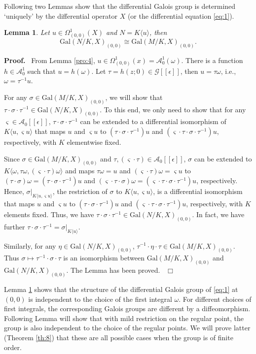 \documentclass[preprint, 12pt]{elsarticle}
\newtheorem{lem}[thm]{Lemma}
\numberwithin{equation}{section}
\newenvironment{proof}[1][Proof]{\textbf{#1.}\ }{\ $\Box$}
\newcommand{\A}{\mathcal{A}}
\newcommand{\G}{\mathcal{G}}
\newcommand{\Gal}{\mathrm{Gal}}
\newcommand{\CA}{\G[[\epsilon]]}
\begin{document}
Following two Lemmas show that the differential Galois group is
determined `uniquely' by the differential operator $X$ (or the
differential equation \eqref{eq:1}).

\begin{lem}
\label{le:1} Let $u\in \Omega_{(0,0)}^1(X)$ and $N = K\langle u
\rangle$, then $$\Gal(N/K, X)_{(0,0)}\cong \Gal(M/K,X)_{(0,0)}.$$
\end{lem}
\begin{proof}
From Lemma \ref{pro:4}, $u\in \Omega_{(0,0)}^1(x) =
\A_0^1(\omega)$. There is a function $h\in \A_0^1$ such that $u =
h(\omega)$. Let $\tau = h(z;0)\in \CA$, then $u = \tau\omega$,
i.e., $\omega = \tau^{-1}u$.

For any $\sigma\in \Gal(M/K,X)_{(0,0)}$, we will show that
$\tau\cdot\sigma\cdot\tau^{-1}\in \Gal(N/K,X)_{(0,0)}$. To this
end, we only need to show that for any $\varsigma\in
\A_0[[\epsilon]]$, $\tau\cdot\sigma\cdot\tau^{-1}$ can be extended
to a differential isomorphism of $K\langle u, \varsigma u \rangle$
that maps $u$ and $\varsigma u$ to
$(\tau\cdot\sigma\cdot\tau^{-1})u$ and
$(\varsigma\cdot\tau\cdot\sigma\cdot\tau^{-1})u$, respectively,
with $K$ elementwise fixed. 

Since $\sigma\in \Gal(M/K, X)_{(0,0)}$
and $\tau, (\varsigma\cdot\tau)\in \A_0[[\epsilon]]$, $\sigma$ can
be extended to $K\langle \omega, \tau\omega,
(\varsigma\cdot\tau)\omega\rangle$ and maps $\tau\omega = u$ and
$(\varsigma\cdot\tau)\omega = \varsigma u$ to
$(\tau\cdot\sigma)\omega = (\tau\cdot\sigma\cdot\tau^{-1})u$ and
$(\varsigma\cdot\tau\cdot\sigma)\omega =
(\varsigma\cdot\tau\cdot\sigma\cdot\tau^{-1})u$, respectively.
Hence,  $\sigma|_{K\langle u, \varsigma u\rangle}$, the
restriction of $\sigma$ to $K\langle u, \varsigma u\rangle$, is a
differential isomorphism that maps $u$ and $ \varsigma u$ to
$(\tau\cdot\sigma\cdot\tau^{-1})u$ and
$(\varsigma\cdot\tau\cdot\sigma\cdot\tau^{-1})u$, respectively,
with $K$ elements fixed. Thus, we have $\tau\cdot\sigma\cdot\tau^{-1}\in \Gal(N/K,X)_{(0,0)}$. In fact, we have further $\tau\cdot\sigma\cdot\tau^{-1} =
\sigma|_{K\langle u\rangle}$.

Similarly, for any $\eta\in \Gal(N/K,X)_{(0,0)}$,
$\tau^{-1}\cdot\eta\cdot\tau\in \Gal(M/K,X)_{(0,0)}$. Thus
$\sigma\mapsto \tau^{-1}\cdot\sigma\cdot\tau$ is an isomorphism
between $\Gal(M/K,X)_{(0,0)}$ and $\Gal(N/K, X)_{(0,0)}$. The
Lemma has been proved.
\end{proof}

Lemma \ref{le:1} shows that the structure of the differential Galois group of
\eqref{eq:1} at $(0,0)$ is independent to the choice of the first
integral $\omega$. For different choices of first integrals, the corresponding Galois groups are different by a diffeomorphism. Following Lemma will
show that with mild restriction on the regular point, the group is also independent to
the choice of the regular points. We will prove latter (Theorem
\ref{th:8}) that these are all possible cases when the group is of
finite order.
\end{document}
